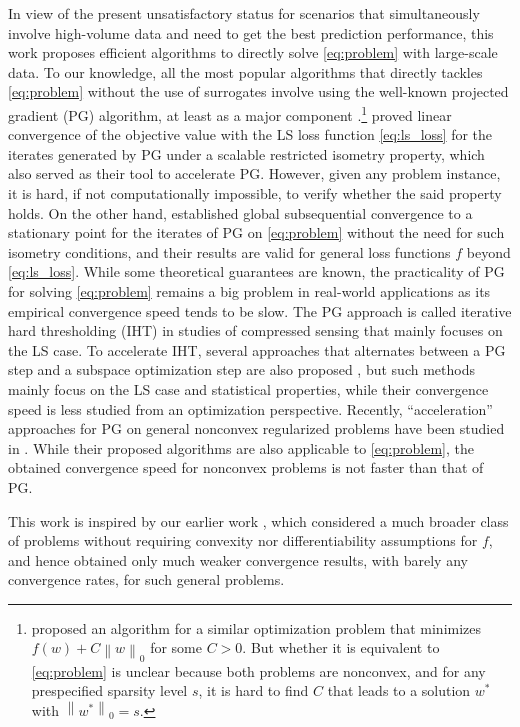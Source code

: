 \documentclass{article}
\newcommand{\alert}[1]{{#1}}
\newcommand{\alertt}[1]{{#1}}
\newcommand{\Alertt}[1]{{#1}}
\theoremstyle{plain}
\theoremstyle{definition}
\theoremstyle{remark}
\newcommand{\norm}[1]{{\left\|{#1}\right\|}}
\begin{document}
In view of the present unsatisfactory status for scenarios that
simultaneously involve high-volume data and need to get the best prediction performance,
this work proposes efficient algorithms to directly solve \cref{eq:problem}
with large-scale data.
\alertt{To our knowledge, all the most popular algorithms that directly tackles
\cref{eq:problem} without the use of surrogates involve using the
well-known projected gradient (PG) algorithm, at least as a major component}
\alert{\citep{BT11,BKM16,Blu12,BluDav09,BahRB13a}}.\footnote{\cite{GotTT18a} proposed 
an 
algorithm for a similar
optimization problem that minimizes $f(w) + C\norm{w}_0$ for some
$C > 0$. But whether it is equivalent to \cref{eq:problem} is unclear
because both problems are nonconvex, and for any prespecified sparsity
level $s$, it is hard to find $C$ that leads to a solution $w^*$
with $\norm{w^*}_0 = s$.}
	\cite{BT11} proved 
linear convergence of the objective value with the LS loss
function \cref{eq:ls_loss} for the iterates generated by PG under a
scalable restricted isometry property, which also served as their tool
to accelerate PG. However, given any problem instance, it is  hard, if not
computationally impossible, to verify whether the said property holds.
On the other hand, \cite{BKM16} established
global subsequential convergence to a stationary point for the iterates of PG 
on \cref{eq:problem} without the need for such isometry conditions, and their 
results 
are valid for general loss functions $f$ beyond \cref{eq:ls_loss}.
While some theoretical guarantees are 
known, the practicality of PG for solving 
\cref{eq:problem} remains a big problem in real-world applications
as its empirical convergence speed tends to be slow.
\alertt{The PG approach is called iterative hard thresholding (IHT) in studies of
compressed sensing \citep{BluDav09} that mainly focuses on the
LS case.
To accelerate IHT, several approaches that alternates between a PG
step and a subspace optimization step are also proposed
\cite{Blu12,BahRB13a}, but such methods mainly focus on the
LS case and statistical properties, while their convergence speed is
less studied from an optimization perspective.}
Recently, ``acceleration'' approaches for PG on general nonconvex regularized problems have
been studied in \cite{NIPS2015_f7664060,WCP18}. While their proposed
algorithms are also applicable to \cref{eq:problem}, the obtained convergence 
speed for nonconvex problems is
not faster than that of PG.

\Alertt{This work is inspired by our earlier work \cite{JHA22a}, which
considered a much broader class of problems without requiring convexity nor 
differentiability assumptions
for $f$, and hence obtained only much weaker convergence results,
with barely any convergence rates, for such general problems.}
\end{document}
